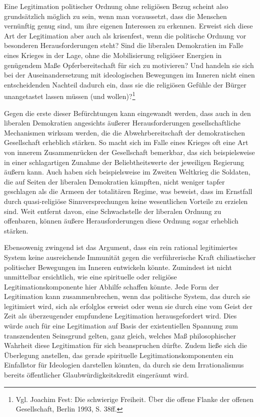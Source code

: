 Eine Legitimation politischer Ordnung ohne religiösen Bezug scheint also
grundsätzlich möglich zu sein, wenn man voraussetzt, dass die Menschen
vernünftig genug sind, um ihre eigenen Interessen zu erkennen.  Erweist sich
diese Art der Legitimation aber auch als krisenfest, wenn die politische
Ordnung vor besonderen Herausforderungen steht? Sind die liberalen Demokratien
im Falle eines Krieges in der Lage, ohne die Mobilisierung religiöser Energien
in genügendem Maße Opferbereitschaft für sich zu motivieren? Und handeln sie
sich bei der Auseinandersetzung mit ideologischen Bewegungen im Inneren nicht
einen entscheidenden Nachteil dadurch ein, dass sie die religiösen Gefühle der
Bürger unangetastet lassen müssen (und wollen)?\footnote{Vgl. Joachim Fest:
  Die schwierige Freiheit. Über die offene Flanke der offenen Gesellschaft,
  Berlin 1993, S. 38ff.}

Gegen die erste dieser Befürchtungen kann eingewandt werden, dass auch in den
liberalen Demokratien angesichts äußerer Herausforderungen gesellschaftliche
Mechanismen wirksam werden, die die Abwehrbereitschaft der demokratischen
Gesellschaft erheblich stärken. So macht sich im Falle eines Krieges oft eine
Art von innerem Zusammenrücken der Gesellschaft bemerkbar, das sich
beispielsweise in einer schlagartigen Zunahme der Beliebtheitswerte der
jeweiligen Regierung äußern kann. Auch haben sich beispielsweise im Zweiten
Weltkrieg die Soldaten, die auf Seiten der liberalen Demokratien kämpften,
nicht weniger tapfer geschlagen als die Armeen der totalitären Regime, was
beweist, dass im Ernstfall durch quasi-religiöse Sinnversprechungen keine
wesentlichen Vorteile zu erzielen sind. Weit entfernt davon, eine
Schwachstelle der liberalen Ordnung zu offenbaren, können äußere
Herausforderungen diese Ordnung sogar erheblich stärken.

Ebensowenig zwingend ist das Argument, dass ein rein rational legitimiertes
System keine ausreichende Immunität gegen die verführerische Kraft
chiliastischer politischer Bewegungen im Inneren entwickeln könnte.  Zumindest
ist nicht unmittelbar ersichtlich, wie eine spirituelle oder religiöse
Legitimationskomponente hier Abhilfe schaffen könnte. Jede Form der
Legitimation kann zusammenbrechen, wenn das politische System, das durch sie
legitimiert wird, sich als erfolglos erweist oder wenn sie durch eine vom
Geist der Zeit als überzeugender empfundene Legitimation herausgefordert wird.
Dies würde auch für eine Legitimation auf Basis der existentiellen Spannung
zum transzendenten Seinsgrund gelten, ganz gleich, welches Maß philosophischer
Wahrheit diese Legitimation für sich beanspruchen dürfte. Zudem ließe sich die
Überlegung anstellen, das gerade spirituelle Legitimationskomponenten ein
Einfallstor für Ideologien darstellen könnten, da durch sie dem
Irrationalismus bereits öffentlicher Glaubwürdigkeitskredit eingeräumt wird.

